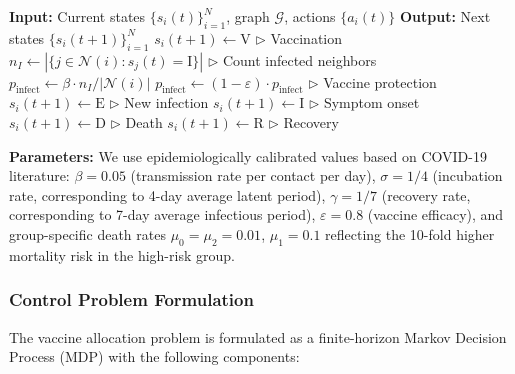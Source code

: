 \begin{algorithm}[h]
\caption{CTMP Simulation (one time step)}
\label{alg:ctmp_step}
\begin{algorithmic}[1]
\STATE \textbf{Input:} Current states $\{s_i(t)\}_{i=1}^N$, graph $\mathcal{G}$, actions $\{a_i(t)\}$
\STATE \textbf{Output:} Next states $\{s_i(t+1)\}_{i=1}^N$
\STATE
{}
        \STATE $s_i(t+1) \gets \text{V}$ \hfill $\triangleright$ Vaccination
        \STATE $n_I \gets |\{j \in \mathcal{N}(i) : s_j(t) = \text{I}\}|$ \hfill $\triangleright$ Count infected neighbors
        \STATE $p_{\text{infect}} \gets \beta \cdot n_I / |\mathcal{N}(i)|$
            \STATE $p_{\text{infect}} \gets (1-\varepsilon) \cdot p_{\text{infect}}$ \hfill $\triangleright$ Vaccine protection
        \ENDIF
            \STATE $s_i(t+1) \gets \text{E}$ \hfill $\triangleright$ New infection
        \ENDIF
        \STATE $s_i(t+1) \gets \text{I}$ \hfill $\triangleright$ Symptom onset
            \STATE $s_i(t+1) \gets \text{D}$ \hfill $\triangleright$ Death
        \ELSE
            \STATE $s_i(t+1) \gets \text{R}$ \hfill $\triangleright$ Recovery
        \ENDIF
    \ENDIF
\ENDFOR
\end{algorithmic}
\end{algorithm}

\textbf{Parameters:} We use epidemiologically calibrated values based on COVID-19 literature:
$\beta = 0.05$ (transmission rate per contact per day),
$\sigma = 1/4$ (incubation rate, corresponding to 4-day average latent period),
$\gamma = 1/7$ (recovery rate, corresponding to 7-day average infectious period),
$\varepsilon = 0.8$ (vaccine efficacy),
and group-specific death rates $\mu_0 = \mu_2 = 0.01$, $\mu_1 = 0.1$ reflecting the
10-fold higher mortality risk in the high-risk group.

\subsubsection{Control Problem Formulation}

The vaccine allocation problem is formulated as a finite-horizon Markov Decision Process (MDP)
with the following components:

